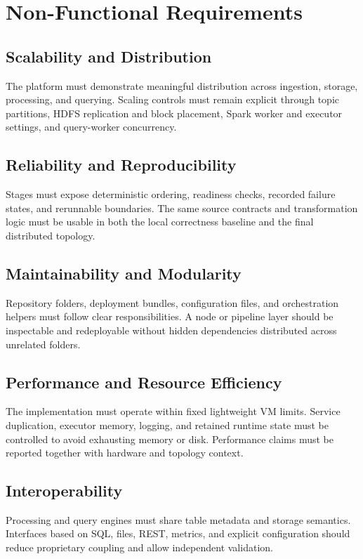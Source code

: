 \section{Non-Functional Requirements}

\subsection{Scalability and Distribution}
The platform must demonstrate meaningful distribution across ingestion, storage, processing, and querying. Scaling controls must remain explicit through topic partitions, HDFS replication and block placement, Spark worker and executor settings, and query-worker concurrency.

\subsection{Reliability and Reproducibility}
Stages must expose deterministic ordering, readiness checks, recorded failure states, and rerunnable boundaries. The same source contracts and transformation logic must be usable in both the local correctness baseline and the final distributed topology.

\subsection{Maintainability and Modularity}
Repository folders, deployment bundles, configuration files, and orchestration helpers must follow clear responsibilities. A node or pipeline layer should be inspectable and redeployable without hidden dependencies distributed across unrelated folders.

\subsection{Performance and Resource Efficiency}
The implementation must operate within fixed lightweight VM limits. Service duplication, executor memory, logging, and retained runtime state must be controlled to avoid exhausting memory or disk. Performance claims must be reported together with hardware and topology context.

\subsection{Interoperability}
Processing and query engines must share table metadata and storage semantics. Interfaces based on SQL, files, REST, metrics, and explicit configuration should reduce proprietary coupling and allow independent validation.

